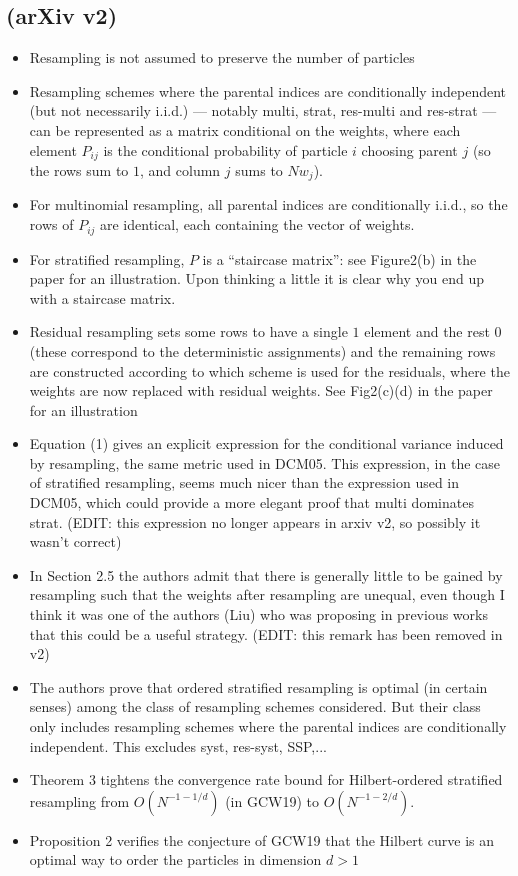 \documentclass{article}
\begin{document}
\subsection*{\cite{li2020} (arXiv v2)}
\begin{itemize}
\item Resampling is not assumed to preserve the number of particles
\item Resampling schemes where the parental indices are conditionally independent (but not necessarily i.i.d.) --- notably multi, strat, res-multi and res-strat --- can be represented as a matrix conditional on the weights, where each element $P_{ij}$ is the conditional probability of particle $i$ choosing parent $j$ (so the rows sum to $1$, and column $j$ sums to $Nw_j$).
\item For multinomial resampling, all parental indices are conditionally i.i.d., so the rows of $P_{ij}$ are identical, each containing the vector of weights.
\item For stratified resampling, $P$ is a ``staircase matrix'': see Figure2(b) in the paper for an illustration. Upon thinking a little it is clear why you end up with a staircase matrix.
\item Residual resampling sets some rows to have a single $1$ element and the rest $0$ (these correspond to the deterministic assignments) and the remaining rows are constructed according to which scheme is used for the residuals, where the weights are now replaced with residual weights. See Fig2(c)(d) in the paper for an illustration
\item Equation (1) gives an explicit expression for the conditional variance induced by resampling, the same metric used in DCM05. This expression, in the case of stratified resampling, seems much nicer than the expression used in DCM05, which could provide a more elegant proof that multi dominates strat. (EDIT: this expression no longer appears in arxiv v2, so possibly it wasn't correct)
\item In Section 2.5 the authors admit that there is generally little to be gained by resampling such that the weights after resampling are unequal, even though I think it was one of the authors (Liu) who was proposing in previous works that this could be a useful strategy. (EDIT: this remark has been removed in v2)
\item The authors prove that ordered stratified resampling is optimal (in certain senses) among the class of resampling schemes considered. But their class only includes resampling schemes where the parental indices are conditionally independent. This excludes syst, res-syst, SSP,...
\item Theorem 3 tightens the convergence rate bound for Hilbert-ordered stratified resampling from $O(N^{-1-1/d})$ (in GCW19) to $O(N^{-1-2/d})$.
\item Proposition 2 verifies the conjecture of GCW19 that the Hilbert curve is an optimal way to order the particles in dimension $d>1$
\end{itemize}
\end{document}

